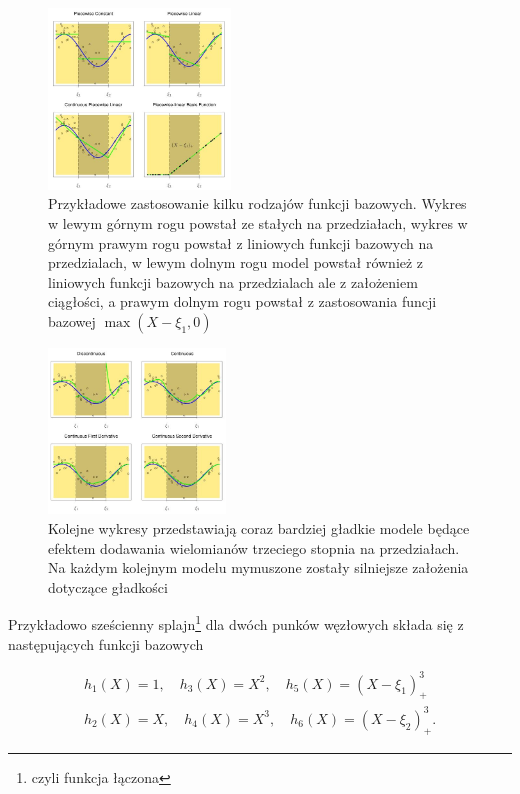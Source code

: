 \documentclass[
]{book}
\theoremstyle{plain}
\theoremstyle{definition}
\theoremstyle{definition}
\theoremstyle{definition}
\theoremstyle{definition}
\theoremstyle{definition}
\theoremstyle{remark}
\begin{document}
\begin{figure}

{\centering \includegraphics[width=1.91in]{images/spline1} 

}

\caption{Przykładowe zastosowanie kilku rodzajów funkcji bazowych. Wykres w lewym górnym rogu powstał ze stałych na przedziałach, wykres w górnym prawym rogu powstał z liniowych funkcji bazowych na przedzialach, w lewym dolnym rogu model powstał również z liniowych funkcji bazowych na przedzialach ale z założeniem ciągłości, a prawym dolnym rogu powstał z zastosowania funcji bazowej $\max(X-\xi_1,0)$}\label{fig:spline1}
\end{figure}

\begin{figure}

{\centering \includegraphics[width=1.85in]{images/spline2} 

}

\caption{Kolejne wykresy przedstawiają coraz bardziej gładkie modele będące efektem dodawania wielomianów trzeciego stopnia na przedziałach. Na każdym kolejnym modelu mymuszone zostały silniejsze założenia dotyczące gładkości}\label{fig:spline2}
\end{figure}

Przykładowo sześcienny splajn\footnote{czyli funkcja łączona} dla dwóch punków węzłowych składa się z następujących funkcji bazowych

\begin{gather}
    h_1(X)=1,\quad h_3(X)=X^2,\quad h_5(X)=(X-\xi_1)_+^3\\
    h_2(X)=X,\quad h_4(X)=X^3,\quad h_6(X)=(X-\xi_2)_+^3.
\end{gather}
\end{document}
